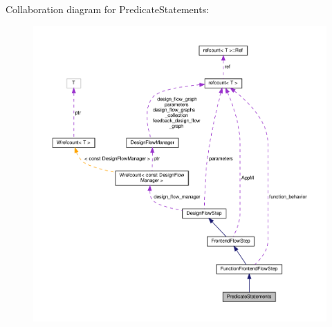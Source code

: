 Collaboration diagram for Predicate\+Statements\+:
\nopagebreak
\begin{figure}[H]
\begin{center}
\leavevmode
\includegraphics[width=350pt]{db/dfc/classPredicateStatements__coll__graph}
\end{center}
\end{figure}
